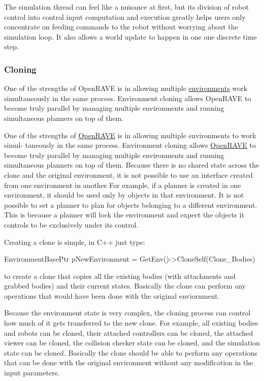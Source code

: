 The simulation thread can feel like a nuisance at first, but its division of robot control into control input computation and execution greatly helps users only concentrate on feeding commands to the robot without worrying about the simulation loop. It also allows a world update to happen in one one discrete time step.\hypertarget{architecture__concepts_arch_cloning}{}\subsubsection{Cloning}\label{architecture__concepts_arch_cloning}
One of the strengths of OpenRAVE is in allowing multiple \hyperlink{classOpenRAVE_1_1EnvironmentBase}{environments} work simultaneously in the same process. Environment cloning allows OpenRAVE to become truly parallel by managing multiple environments and running simultaneous planners on top of them.

One of the strengths of \hyperlink{namespaceOpenRAVE}{OpenRAVE} is in allowing multiple environments to work simul-\/ taneously in the same process. Environment cloning allows \hyperlink{namespaceOpenRAVE}{OpenRAVE} to become truly parallel by managing multiple environments and running simultaneous planners on top of them. Because there is no shared state across the clone and the original environment, it is not possible to use an interface created from one environment in another For example, if a planner is created in one environment, it should be used only by objects in that environment. It is not possible to set a planner to plan for objects belonging to a different environment. This is because a planner will lock the environment and expect the objects it controls to be exclusively under its control.

Creating a clone is simple, in C++ just type:


\begin{DoxyCode}
EnvironmentBasePtr pNewEnvironment = GetEnv()->CloneSelf(Clone_Bodies)
\end{DoxyCode}


to create a clone that copies all the existing bodies (with attachments and grabbed bodies) and their current states. Basically the clone can perform any operations that would have been done with the original enviornment.

Because the environment state is very complex, the cloning process can control how much of it gets transferred to the new clone. For example, all existing bodies and robots can be cloned, their attached controllers can be cloned, the attached viewer can be cloned, the collision checker state can be cloned, and the simulation state can be cloned. Basically the clone should be able to perform any operations that can be done with the original environment without any modification in the input parameters.

